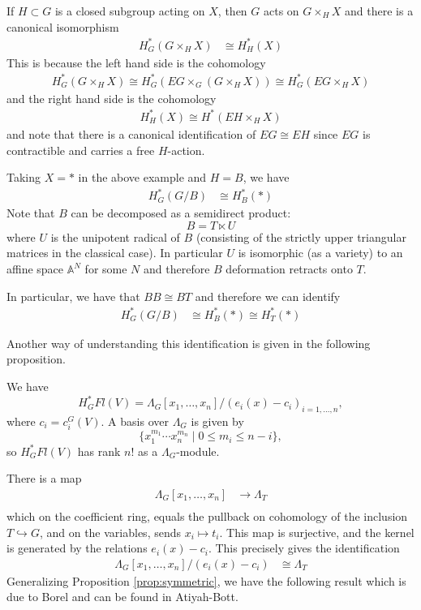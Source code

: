 \documentclass[12pt]{article}
\begin{document}
\begin{example}
    If $H\subset G$ is a closed subgroup acting on $X$, then $G$ acts on $G\times_H X$ and there is a canonical isomorphism \begin{align*}
        H^*_G(G\times_H X) & \cong H^*_H(X)
    \end{align*}
    This is because the left hand side is the cohomology \begin{align*}
        H^*_G(G\times_H X) \cong H^*_G(EG \times_G (G\times_H X)) \cong H^*_G(EG \times_H X)
    \end{align*} and the right hand side is the cohomology \begin{align*}
        H^*_H(X)\cong H^*(EH \times_H X)
    \end{align*} and note that there is a canonical identification of $EG \cong EH$ since $EG$ is contractible and carries a free $H$-action.
\end{example}
\begin{example}
    Taking $X = *$ in the above example and $H = B$, we have \begin{align*}
        H^*_G(G/B) & \cong H^*_B(*)
    \end{align*} Note that $B$ can be decomposed as a semidirect product:
    \[B = T \ltimes U\]
    where $U$ is the unipotent radical of $B$ (consisting of the strictly upper triangular matrices in the classical case). In particular $U$ is isomorphic (as a variety) to an affine space $\mathbb{A}^N$ for some $N$ and therefore $B$ deformation retracts onto $T$.

    In particular, we have that $BB \cong BT$ and therefore we can identify \begin{align*}
        H^*_G(G/B) & \cong H^*_B(*) \cong H^*_T(*)
    \end{align*}
\end{example}
Another way of understanding this identification is given in the following proposition.
\begin{proposition}
    We have
    \[H^*_G Fl(V) = \Lambda_G[x_1,\ldots,x_n]/(e_i(x) - c_i)_{i=1,\ldots,n},\]
    where $c_i = c_i^G(V)$. A basis over $\Lambda_G$ is given by
    \[\{x_1^{m_1}\cdots x_n^{m_n} \mid 0 \leq m_i \leq n-i\},\]
    so $H^*_G Fl(V)$ has rank $n!$ as a $\Lambda_G$-module.
\end{proposition}
There is a map \begin{align*}
    \Lambda_G[x_1,\ldots,x_n] & \to \Lambda_T \\
\end{align*} which on the coefficient ring, equals the pullback on cohomology of the inclusion $T \hookrightarrow G$, and on the variables, sends $x_i \mapsto t_i$. This map is surjective, and the kernel is generated by the relations $e_i(x) - c_i$. This precisely gives the identification \begin{align*}
    \Lambda_G[x_1,\ldots,x_n]/(e_i(x) - c_i) & \cong \Lambda_T
\end{align*}
Generalizing Proposition \ref{prop:symmetric}, we have the following result which is due to Borel and can be found in Atiyah-Bott.
\end{document}
